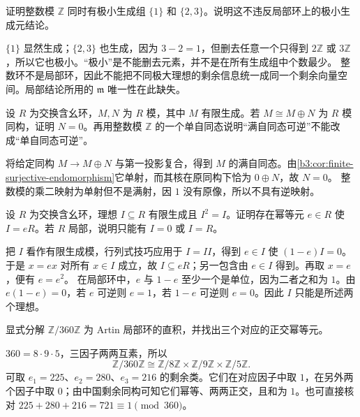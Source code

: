 \begin{exercise}\label{b3:ex:03-nonlocal-minimal}
	证明整数模 \(\mathbb Z\) 同时有极小生成组 \(\{1\}\) 和 \(\{2,3\}\)。说明这不违反局部环上的极小生成元结论。
\end{exercise}
\begin{solution}
	\(\{1\}\) 显然生成；\(\{2,3\}\) 也生成，因为 \(3-2=1\)，但删去任意一个只得到 \(2\mathbb Z\) 或 \(3\mathbb Z\)，所以它也极小。“极小”是不能删去元素，并不是在所有生成组中个数最少。 整数环不是局部环，因此不能把不同极大理想的剩余信息统一成同一个剩余向量空间。局部结论所用的 \(\mathfrak m\) 唯一性在此缺失。
\end{solution}

\begin{exercise}\label{b3:ex:03-surjective-endomorphism}
	设 \(R\) 为交换含幺环，\(M,N\) 为 \(R\) 模，其中 \(M\) 有限生成。若 \(M\cong M\oplus N\) 为 \(R\) 模同构，证明 \(N=0\)。再用整数模 \(\mathbb Z\) 的一个单自同态说明“满自同态可逆”不能改成“单自同态可逆”。
\end{exercise}
\begin{solution}
	将给定同构 \(M\rightarrow M\oplus N\) 与第一投影复合，得到 \(M\) 的满自同态。由\cref{b3:cor:finite-surjective-endomorphism}它单射，而其核在原同构下恰为 \(0\oplus N\)，故 \(N=0\)。 整数模的乘二映射为单射但不是满射，因 \(1\) 没有原像，所以不具有逆映射。
\end{solution}

\begin{exercise}\label{b3:ex:03-idempotent-ideal}
	设 \(R\) 为交换含幺环，理想 \(I\subseteq R\) 有限生成且 \(I^2=I\)。证明存在幂等元 \(e\in R\) 使 \(I=eR\)。若 \(R\) 局部，说明只能有 \(I=0\) 或 \(I=R\)。
\end{exercise}
\begin{solution}
	把 \(I\) 看作有限生成模，行列式技巧应用于 \(I=II\)，得到 \(e\in I\) 使 \((1-e)I=0\)。于是 \(x=ex\) 对所有 \(x\in I\) 成立，故 \(I\subseteq eR\)；另一包含由 \(e\in I\) 得到。再取 \(x=e\)，便有 \(e=e^2\)。 在局部环中，\(e\) 与 \(1-e\) 至少一个是单位，因为二者之和为 \(1\)。由 \(e(1-e)=0\)，若 \(e\) 可逆则 \(e=1\)，若 \(1-e\) 可逆则 \(e=0\)。因此 \(I\) 只能是所述两个理想。
\end{solution}

\begin{exercise}\label{b3:ex:03-integer-artin-product}
	显式分解 \(\mathbb Z/360\mathbb Z\) 为 Artin 局部环的直积，并找出三个对应的正交幂等元。
\end{exercise}
\begin{solution}
	\(360=8\cdot9\cdot5\)，三因子两两互素，所以
	\[
		\mathbb Z/360\mathbb Z\cong \mathbb Z/8\mathbb Z\times\mathbb Z/9\mathbb Z\times\mathbb Z/5\mathbb Z.
	\]
	可取 \(e_1=225\)、\(e_2=280\)、\(e_3=216\) 的剩余类。它们在对应因子中取 \(1\)，在另外两个因子中取 \(0\)；由中国剩余同构可知它们幂等、两两正交，且和为 \(1\)。也可直接核对 \(225+280+216=721\equiv1\pmod{360}\)。
\end{solution}


